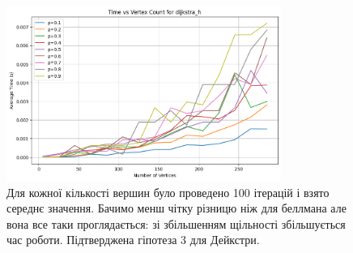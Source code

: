 \documentclass[a4paper,12pt]{article}
\begin{document}
\begin{figure}[ht]
    \centering
    \includegraphics[width=0.8\textwidth]{img/p_dijkstra.png}
    \caption{Для кожної кількості вершин було проведено 100 ітерацій і взято середнє значення. Бачимо менш чітку різницю ніж для беллмана але вона все таки проглядається: 
    зі збільшенням щільності збільшується час роботи. Підтверджена гіпотеза 3 для Дейкстри.}
    \label{fig:p_dijkstra}
\end{figure}
\end{document}
